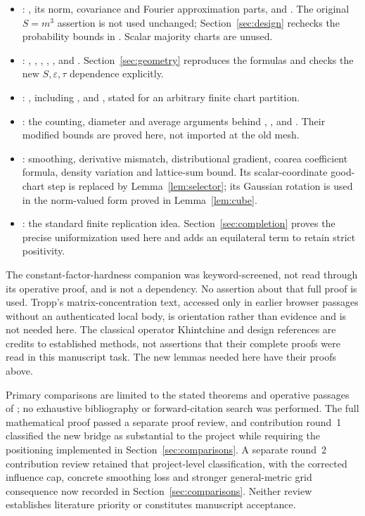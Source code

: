 \documentclass[11pt]{article}
\theoremstyle{remark}\newtheorem{remark}[theorem]{Remark}
\numberwithin{equation}{section}
\begin{document}
\begin{itemize}
\item {}: , its norm,
covariance and Fourier approximation parts, and
. The original $S=m^3$ assertion is not used
unchanged; Section~\ref{sec:design} rechecks the probability bounds in
. Scalar majority charts are unused.
\item {}: ,
, ,
, ,
 and .
Section~\ref{sec:geometry} reproduces the formulas and checks the new
$S,\varepsilon,\tau$ dependence explicitly.
\item {}: , including
,  and
, stated for an arbitrary finite chart partition.
\item {}: the counting, diameter and average arguments
behind , ,
 and .
Their modified bounds are proved here, not imported at the old mesh.
\item {}: smoothing, derivative mismatch,
distributional gradient, coarea coefficient formula, density variation
and lattice-sum bound. Its scalar-coordinate good-chart step is replaced
by Lemma~\ref{lem:selector}; its Gaussian rotation is used in the
norm-valued form proved in Lemma~\ref{lem:cube}.
\item {}: the standard finite replication idea.
Section~\ref{sec:completion} proves the precise uniformization used here
and adds an equilateral term to retain strict positivity.
\end{itemize}
The constant-factor-hardness companion was keyword-screened, not read
through its operative proof, and is not a dependency. No assertion about
that full proof is used. Tropp's matrix-concentration text, accessed only
in earlier browser passages without an authenticated local body, is
orientation rather than evidence and is not needed here. The classical
operator Khintchine and design references are credits to established
methods, not assertions that their complete proofs were read in this
manuscript task. The new lemmas needed here have their proofs above.

Primary comparisons are limited to the stated theorems and operative
passages of \cite{NPS,NY,KNT,LWW,CEE,JLW,MN,GMN,EGM}; no exhaustive
bibliography or forward-citation search was performed. The full
mathematical proof passed a separate proof review, and contribution
round~1 classified the new bridge as substantial to the project while
requiring the positioning implemented in Section~\ref{sec:comparisons}.
A separate round~2 contribution review retained that project-level
classification, with the corrected influence cap, concrete smoothing
loss and stronger general-metric grid consequence now recorded in
Section~\ref{sec:comparisons}. Neither review establishes literature
priority or constitutes manuscript acceptance.
\end{document}
